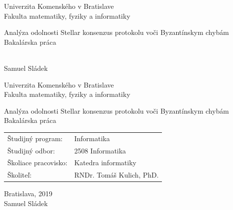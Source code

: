 \documentclass[12pt, twoside]{book}
\def\mfrok{2019}
\def\mfnazov{Analýza odolnosti Stellar konsenzus protokolu voči Byzantínskym chybám}
\def\mftyp{Bakalárska práca}
\def\mfautor{Samuel Sládek}
\def\mfskolitel{RNDr. Tomáš Kulich, PhD.}
\def\mfmiesto{Bratislava, \mfrok}
\def\mfodbor{2508 Informatika}
\def\program{ Informatika }
\def\mfpracovisko{ Katedra informatiky }
\begin{document}
     
\frontmatter


\thispagestyle{empty}

\begin{center}
\sc\large
Univerzita Komenského v Bratislave\\
Fakulta matematiky, fyziky a informatiky

\vfill

{\LARGE\mfnazov}\\
\mftyp
\end{center}

\vfill

{\sc\large 
\noindent \mfrok\\
\mfautor
}

\eject %


\thispagestyle{empty}
\noindent

\begin{center}
\sc  
\large
Univerzita Komenského v Bratislave\\
Fakulta matematiky, fyziky a informatiky

\vfill

{\LARGE\mfnazov}\\
\mftyp
\end{center}

\vfill

\noindent
\begin{tabular}{ll}
Študijný program: & \program \\
Študijný odbor: & \mfodbor \\
Školiace pracovisko: & \mfpracovisko \\
Školiteľ: & \mfskolitel \\
\end{tabular}

\vfill


\noindent \mfmiesto\\
\mfautor

\eject %




\end{document}
